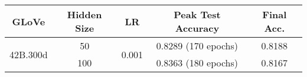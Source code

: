 \begin{table}[]
\begin{tabular}{@{}|c|c|c|c|c|@{}}
\toprule
\textbf{GLoVe}            & \textbf{Hidden Size} & \textbf{LR}            & \textbf{Peak Test Accuracy} & \textbf{Final Acc.} \\ \midrule
\multirow{2}{*}{42B.300d} & 50                   & \multirow{2}{*}{0.001} & 0.8289 (170 epochs)         & 0.8188              \\ \cmidrule(lr){2-2} \cmidrule(l){4-5} 
                          & 100                  &                        & 0.8363 (180 epochs)         & 0.8167              \\ \bottomrule
\end{tabular}
\label{tab:round2}
\end{table}